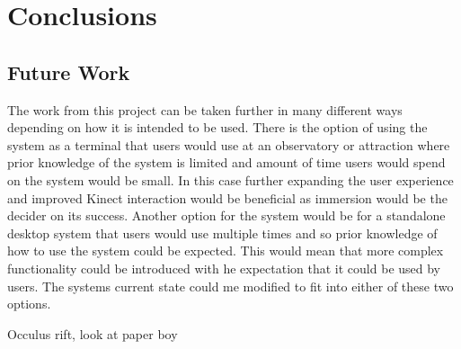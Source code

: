 \chapter{Conclusions}\label{C:con}
\section{Future Work}
The work from this project can be taken further in many different ways depending
on how it is intended to be used. There is the option of using the system as a
terminal that users would use at an observatory or attraction where prior
knowledge of the system is limited and amount of time users would spend on the
system would be small. In this case further expanding the user experience and
improved Kinect interaction would be beneficial as immersion would be the
decider on its success. Another option for the system would be for a standalone
desktop system that users would use multiple times and so prior knowledge of how
to use the system could be expected. This would mean that more complex
functionality could be introduced with he expectation that it could be used by
users. The systems current state could me modified to fit into either of these
two options.

Occulus rift, look at paper boy~